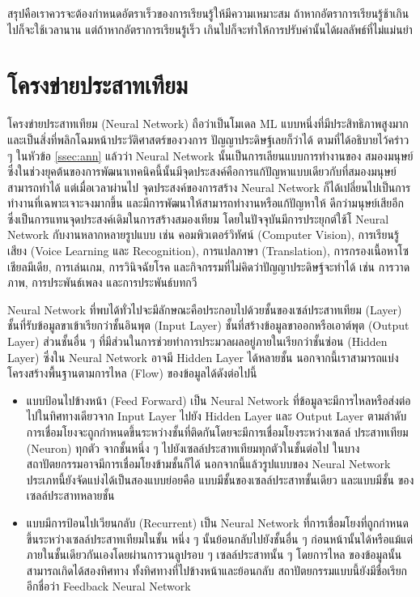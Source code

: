 สรุปคือเราควรจะต้องกำหนดอัตราเร็วของการเรียนรู้ให้มีความเหมาะสม ถ้าหากอัตราการเรียนรู้ช้าเกินไปก็จะใช้เวลานาน แต่ถ้าหากอัตราการเรียนรู้เร็ว%
เกินไปก็จะทำให้การปรับค่านั้นได้ผลลัพธ์ที่ไม่แม่นยำ

\section{โครงข่ายประสาทเทียม}
\label{sec:nn}

โครงข่ายประสาทเทียม (Neural Network) ถือว่าเป็นโมเดล ML แบบหนึ่งที่มีประสิทธิภาพสูงมากและเป็นสิ่งที่พลิกโฉมหน้าประวัติศาสตร์ของวงการ%
ปัญญาประดิษฐ์เลยก็ว่าได้ ตามที่ได้อธิบายไว้คร่าว ๆ ในหัวข้อ \ref{ssec:ann} แล้วว่า Neural Network นั้นเป็นการเลียนแบบการทำงานของ%
สมองมนุษย์ ซึ่งในช่วงยุคต้นของการพัฒนาเทคนิคนี้นั้นมีจุดประสงค์คือการแก้ปัญหาแบบเดียวกับที่สมองมนุษย์สามารถทำได้ แต่เมื่อเวลาผ่านไป%
จุดประสงค์ของการสร้าง Neural Network ก็ได้เปลี่ยนไปเป็นการทำงานที่เฉพาะเจาะจงมากขึ้น และมีการพัฒนาให้สามารถทำงานหรือแก้ปัญหาให้%
ดีกว่ามนุษย์เสียอีก ซึ่งเป็นการแทนจุดประสงค์เดิมในการสร้างสมองเทียม โดยในปัจจุบันมีการประยุกต์ใช้โ Neural Network กับงานหลากหลายรูปแบบ 
เช่น คอมพิวเตอร์วิทัศน์ (Computer Vision), การเรียนรู้เสียง (Voice Learning และ Recognition), การแปลภาษา (Translation), 
การกรองเนื้อหาโซเชียลมีเดีย, การเล่นเกม, การวินิจฉัยโรค และกิจกรรมที่ไม่คิดว่าปัญญาประดิษฐ์จะทำได้ เช่น การวาดภาพ, การประพันธ์เพลง 
และการประพันธ์บทกวี

Neural Network ที่พบได้ทั่วไปจะมีลักษณะคือประกอบไปด้วยชั้นของเซล์ประสาทเทียม (Layer) ชั้นที่รับข้อมูลขาเข้าเรียกว่าชั้นอินพุต (Input 
Layer) ชั้นที่สร้างข้อมูลขาออกหรือเอาต์พุต (Output Layer) ส่วนชั้นอื่น ๆ ที่มีส่วนในการช่วยทำการประมวลผลอยู่ภายในเรียกว่าชั้นซ่อน 
(Hidden Layer) ซึ่งใน Neural Network อาจมี Hidden Layer ได้หลายชั้น นอกจากนี้เราสามารถแบ่งโครงสร้างพื้นฐานตามการไหล (Flow) 
ของข้อมูลได้ดังต่อไปนี้

\begin{itemize}
    \item แบบป้อนไปข้างหน้า (Feed Forward) เป็น Neural Network ที่ข้อมูลจะมีการไหลหรือส่งต่อไปในทิศทางเดียวจาก Input Layer 
    ไปยัง Hidden Layer และ Output Layer ตามลำดับ การเชื่อมโยงจะถูกกำหนดขึ้นระหว่างชั้นที่ติดกันโดยจะมีการเชื่อมโยงระหว่างเซลล์%
    ประสาทเทียม (Neuron) ทุกตัว จากชั้นหนึ่ง ๆ ไปยังเซลล์ประสาทเทียมทุกตัวในชั้นต่อไป ในบางสถาปัตยกรรมอาจมีการเชื่อมโยงข้ามชั้นก็ได้ 
    นอกจากนี้แล้วรูปแบบของ Neural Network ประเภทนี้ยังจัดแบ่งได้เป็นสองแบบย่อยคือ แบบมีชั้นของเซลล์ประสาทชั้นเดียว และแบบมีชั้น%
    ของเซลล์ประสาทหลายชั้น 

    \item แบบมีการป้อนไปเวียนกลับ (Recurrent) เป็น Neural Network ที่การเชื่อมโยงที่ถูกกำหนดขึ้นระหว่างเซลล์ประสาทเทียมในชั้น%
    หนึ่ง ๆ นั้นย้อนกลับไปยังชั้นอื่น ๆ ก่อนหน้านั้นได้หรือแม้แต่ภายในชั้นเดียวกันเองโดยผ่านการวนลูปรอบ ๆ เซลล์ประสาทนั้น ๆ โดยการไหล%
    ของข้อมูลนั้นสามารถเกิดได้สองทิศทาง ทั้งทิศทางที่ไปข้างหน้าและย้อนกลับ สถาปัตยกรรมแบบนี้ยังมีชื่อเรียกอีกชื่อว่า Feedback Neural 
    Network
\end{itemize}

